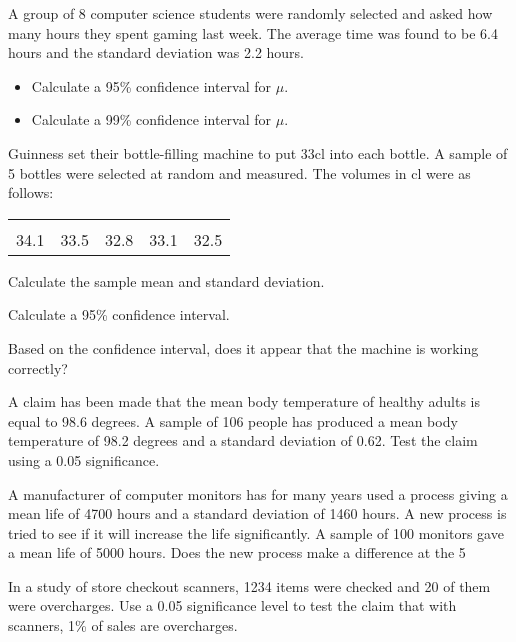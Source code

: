 \item
A group of 8 computer science students were randomly selected and asked how many hours they spent gaming last week. The average time was found to be 6.4 hours and the standard deviation was 2.2 hours.
\begin{itemize}
\item Calculate a 95\% confidence interval for $\mu$. 
\item Calculate a 99\% confidence interval for $\mu$.
\end{itemize}

\item 
Guinness set their bottle-filling machine to put 33cl into each bottle. A sample of 5 bottles were selected at random and measured. The volumes in cl were as follows:\\
\begin{center}
\begin{tabular}{|ccccc|}
\hline
&&&&\\[-0.3cm]
34.1  & 33.5 & 32.8 & 33.1 & 32.5\\[0.1cm]
\hline
\end{tabular}
\end{center}


\item  Calculate the sample mean and standard deviation. 
\item  Calculate a 95\% confidence interval.  
\item  Based on the confidence interval, does it appear that the machine is working correctly?


\item A claim has been made that the mean body temperature of healthy adults is equal to 98.6 degrees. 
A sample of 106 people has produced a mean body temperature of 98.2 degrees and a standard deviation of 0.62. Test the claim using a 0.05 significance.

\item A manufacturer of computer monitors  has for many years used a process giving a mean life of 4700 hours and a standard deviation of 1460 hours. 
A new process is tried to see if it will increase the life significantly. A sample of 100 monitors gave a mean life of 5000 hours.  
Does the new process make a difference at the 5%

\item In a study of store checkout scanners, 1234 items were checked and 20 of them were overcharges.
Use a 0.05 significance level to test the claim that with scanners, 1\% of sales are overcharges.



